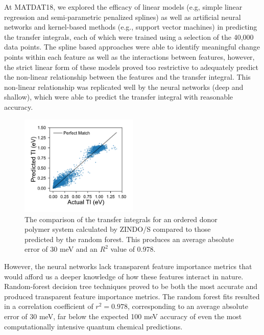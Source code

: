 \documentclass[12pt]{article}
\begin{document}
At MATDAT18, we explored the efficacy of linear models (e.g, simple linear regression and semi-parametric penalized splines) as well as artificial neural networks and kernel-based methods (e.g., support vector machines) in predicting the transfer integrals, each of which were trained using a selection of the 40,000 data points.
The spline based approaches were able to identify meaningful change points within each feature as well as the interactions between features, however, the strict linear form of these models proved too restrictive to adequately predict the non-linear relationship between the features and the transfer integral.
This non-linear relationship was replicated well by the neural networks (deep and shallow), which were able to predict the transfer integral with reasonable accuracy.
\begin{figure}\centering
	\includegraphics[width=0.5\textwidth]{Figures/comparison.pdf}
    \caption{
The comparison of the transfer integrals for an ordered donor polymer system calculated by ZINDO/S compared to those predicted by the random forest.
This produces an average absolute error of 30 meV and an $R^2$ value of 0.978.
}
	\label{fig:random_forest_results}
\end{figure}
However, the neural networks lack transparent feature importance metrics that would afford us a deeper knowledge of how these features interact in nature.
Random-forest decision tree techniques proved to be both the most accurate and produced transparent feature importance metrics.
The random forest fits resulted in a correlation coefficient of $r^{2} = 0.978$, corresponding to an average absolute error of 30 meV, far below the expected 100 meV accuracy of even the most computationally intensive quantum chemical predictions.


\end{document}
